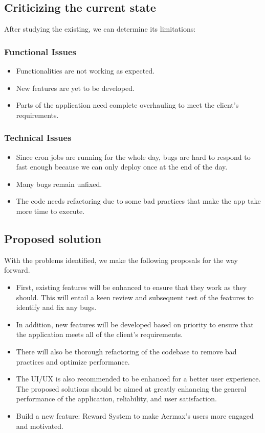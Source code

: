 \subsection{Criticizing the current state}
After studying the existing, we can determine its limitations:
\subsubsection{Functional Issues}
\begin{itemize}
    \item Functionalities are not working as expected.
    \item New features are yet to be developed.
    \item Parts of the application need complete overhauling to meet the client's requirements.
\end{itemize}


\subsubsection{Technical Issues}
\begin{itemize}
    \item Since cron jobs are running for the whole day, bugs are hard to respond to fast enough because we can only deploy once at the end of the day.
    \item Many bugs remain unfixed.
    \item The code needs refactoring due to some bad practices that make the app take more time to execute.
\end{itemize}

\subsection{Proposed solution}
With the problems identified, we make the following proposals for the way forward.

\begin{itemize}
    \item First, existing features will be enhanced to ensure that they work as they should. This will entail a keen review and subsequent test of the features to identify and fix any bugs.
    \item In addition, new features will be developed based on priority to ensure that the application meets all of the client's requirements.
    \item There will also be thorough refactoring of the codebase to remove bad practices and optimize performance.
    \item The UI/UX is also recommended to be enhanced for a better user experience. The proposed solutions should be aimed at greatly enhancing the general performance of the application, reliability, and user satisfaction.
    \item Build a new feature: Reward System to make Aermax's users more engaged and motivated.
\end{itemize}

